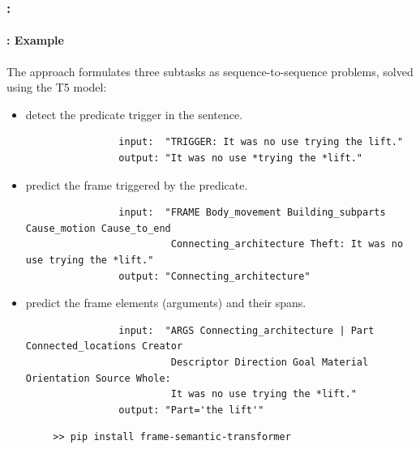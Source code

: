 \documentclass[xcolor=table]{beamer}
\begin{document}
\begin{frame}[fragile]
	\frametitle{\insertshortsubtitle: \insertsection}
	\framesubtitle{\insertsubsection: Example \cite{2023-chanin}}
	
	The approach formulates three subtasks as sequence-to-sequence problems, solved using the T5 model:
	
	\begin{itemize}
		\item {} detect the predicate trigger in the sentence.
		{\scriptsize\bfseries\color{olivegreen} 
			\begin{verbatim}
				input:  "TRIGGER: It was no use trying the lift."
				output: "It was no use *trying the *lift."
			\end{verbatim}
		}
		
		\item {} predict the frame triggered by the predicate.
		{\scriptsize\bfseries\color{olivegreen} 
			\begin{verbatim}
				input:  "FRAME Body_movement Building_subparts Cause_motion Cause_to_end 
				         Connecting_architecture Theft: It was no use trying the *lift."
				output: "Connecting_architecture"
			\end{verbatim}
		}
		
		\item {} predict the frame elements (arguments) and their spans.
		{\scriptsize\bfseries\color{olivegreen} 
			\begin{verbatim}
				input:  "ARGS Connecting_architecture | Part Connected_locations Creator 
				         Descriptor Direction Goal Material Orientation Source Whole: 
				         It was no use trying the *lift."
				output: "Part='the lift'"
			\end{verbatim}
		}
	\end{itemize}
	
	\vspace{-12pt}
	\begin{verbatim}
		>> pip install frame-semantic-transformer 
	\end{verbatim}
	
\end{frame}
\end{document}
